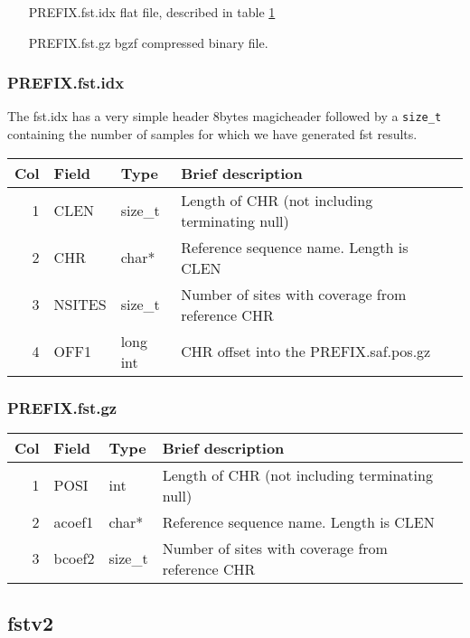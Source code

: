 \documentclass[10pt]{article}
\begin{document}
\begin{itemize}
\item[PREFIX.fst.idx] flat file, described in table \ref{tab2}
\item[PREFIX.fst.gz] bgzf compressed binary file.
\end{itemize}
\subsubsection{PREFIX.fst.idx}
The fst.idx has a very simple header 8bytes magicheader followed by a \texttt{size\_t} containing the number of samples for which we have generated fst results.
\begin{table}[h]
\begin{tabular}{rllll}
  \hline
  {\bf Col} & {\bf Field} & {\bf Type} & {\bf Brief description} \\
  \hline
  1 & {\sf CLEN} & size\_t &  Length of CHR (not including terminating null)\\
  2 & {\sf CHR} & char* & Reference sequence name. Length is CLEN\\
  3 & {\sf NSITES} & size\_t & Number of sites with coverage from reference CHR\\
  4 & {\sf OFF1} & long int & CHR offset into the PREFIX.saf.pos.gz \\
  \hline
\end{tabular}\label{tab2}
\end{table}
\subsubsection{PREFIX.fst.gz}
\begin{table}[h]
\begin{tabular}{rllll}
  \hline
  {\bf Col} & {\bf Field} & {\bf Type} & {\bf Brief description} \\
  \hline
  1 & {\sf POSI} & int &  Length of CHR (not including terminating null)\\
  2 & {\sf acoef1} & char* & Reference sequence name. Length is CLEN\\
  3 & {\sf bcoef2} & size\_t & Number of sites with coverage from reference CHR\\
  \hline
\end{tabular}\label{tab3}
\end{table}


\subsection{fstv2}
\end{document}
